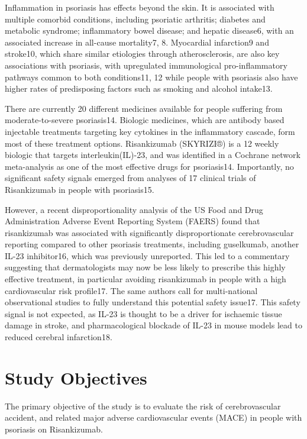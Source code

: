 \documentclass[
  12pt,
]{article}
\begin{document}
Inflammation in psoriasis has effects beyond the skin. It is associated with multiple comorbid conditions, including psoriatic arthritis; diabetes and metabolic syndrome; inflammatory bowel disease; and hepatic disease6, with an associated increase in all-cause mortality7, 8. Myocardial infarction9 and stroke10, which share similar etiologies through atherosclerosis, are also key associations with psoriasis, with upregulated immunological pro-inflammatory pathways common to both conditions11, 12 while people with psoriasis also have higher rates of predisposing factors such as smoking and alcohol intake13.

There are currently 20 different medicines available for people suffering from moderate-to-severe psoriasis14. Biologic medicines, which are antibody based injectable treatments targeting key cytokines in the inflammatory cascade, form most of these treatment options. Risankizumab (SKYRIZI®) is a 12 weekly biologic that targets interleukin(IL)-23, and was identified in a Cochrane network meta-analysis as one of the most effective drugs for psoriasis14. Importantly, no significant safety signals emerged from analyses of 17 clinical trials of Risankizumab in people with psoriasis15.

However, a recent disproportionality analysis of the US Food and Drug Administration Adverse Event Reporting System (FAERS) found that risankizumab was associated with significantly disproportionate cerebrovascular reporting compared to other psoriasis treatments, including guselkumab, another IL-23 inhibitor16, which was previously unreported. This led to a commentary suggesting that dermatologists may now be less likely to prescribe this highly effective treatment, in particular avoiding risankizumab in people with a high cardiovascular risk profile17. The same authors call for multi-national observational studies to fully understand this potential safety issue17. This safety signal is not expected, as IL-23 is thought to be a driver for ischaemic tissue damage in stroke, and pharmacological blockade of IL-23 in mouse models lead to reduced cerebral infarction18.

\hypertarget{study-objectives}{%
\section{Study Objectives}\label{study-objectives}}

The primary objective of the study is to evaluate the risk of cerebrovascular accident, and related major adverse cardiovascular events (MACE) in people with psoriasis on Risankizumab.
\end{document}
